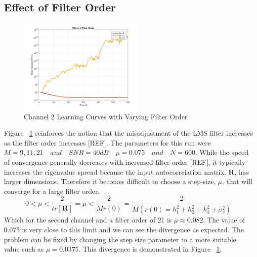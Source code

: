 \documentclass[journal]{IEEEtran}
\begin{document}
\subsection{Effect of Filter Order}
\begin{figure}[H]
  \centering
  \captionsetup{justification=centering,font = small}
  \includegraphics[width=0.55\textwidth, right] {Plots/Project1_Part3.jpg}
  \caption{Channel 2 Learning Curves with Varying Filter Order}
    \label{fig:filterorder1}
\end{figure}
Figure ~\ref{fig:filterorder1} reinforces the notion that the misadjustment
of the LMS filter increases as the filter order increases [REF]. The parameters for this run were $M = 9, 11, 21 \quad and \quad SNR = 40dB
\quad \mu = 0.075 \quad and \quad N = 600$. While the speed of convergence
generally decreases with increased filter order [REF], it typically increases the eigenvalue spread
because the input autocorrelation matrix, $\boldsymbol{R}$, has larger dimensions. Therefore it becomes difficult to
choose a step-size, $\mu$, that will converge for a large filter order.
$$0 < \mu < \dfrac{2}{tr[\boldsymbol{R}]} = \mu < \dfrac{2}{Mr(0)}  = \dfrac{2}{M(r(0) = h_1^2 + h_2^2 + h_3^2 + \sigma^2_v)} $$
Which for the second channel and a filter order of 21 is
$\mu \approx 0.082$. The value of 0.075 is very close to this limit and we can see the divergence as expected.
The problem can be fixed by changing the
step size parameter to a more suitable value such as $ \mu = 0.0375$.
This divergence is demonstrated in Figure ~\ref{fig:filterorder1}.
\end{document}
